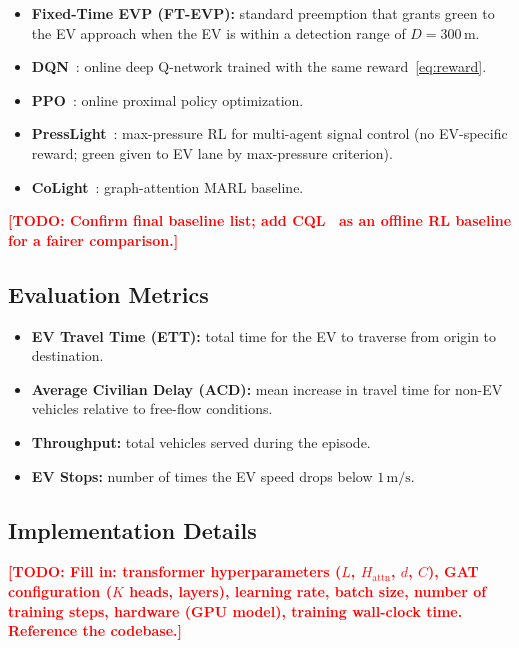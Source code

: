 \documentclass[journal]{IEEEtran}
\newcommand{\todo}[1]{\textcolor{red}{\textbf{[TODO: #1]}}}
\begin{document}
\begin{itemize}
  \item \textbf{Fixed-Time EVP (FT-EVP):} standard preemption that
    grants green to the EV approach when the EV is within a detection
    range of $D = 300\,\text{m}$.
  \item \textbf{DQN}~\cite{mnih2015human}: online deep Q-network
    trained with the same reward~\eqref{eq:reward}.
  \item \textbf{PPO}~\cite{schulman2017proximal}: online proximal
    policy optimization.
  \item \textbf{PressLight}~\cite{wei2019presslight}: max-pressure RL
    for multi-agent signal control (no EV-specific reward; green given
    to EV lane by max-pressure criterion).
  \item \textbf{CoLight}~\cite{wei2019colight}: graph-attention MARL
    baseline.
\end{itemize}

\todo{Confirm final baseline list; add CQL~\cite{kumar2020conservative}
as an offline RL baseline for a fairer comparison.}

\subsection{Evaluation Metrics}
\label{sec:setup:metrics}

\begin{itemize}
  \item \textbf{EV Travel Time (ETT):} total time for the EV to
    traverse from origin to destination.
  \item \textbf{Average Civilian Delay (ACD):} mean increase in
    travel time for non-EV vehicles relative to free-flow conditions.
  \item \textbf{Throughput:} total vehicles served during the episode.
  \item \textbf{EV Stops:} number of times the EV speed drops below
    $1\,\text{m/s}$.
\end{itemize}

\subsection{Implementation Details}
\label{sec:setup:impl}

\todo{Fill in: transformer hyperparameters ($L$, $H_{\text{attn}}$,
$d$, $C$), GAT configuration ($K$ heads, layers), learning rate,
batch size, number of training steps, hardware (GPU model), training
wall-clock time.  Reference the codebase.}
\end{document}
